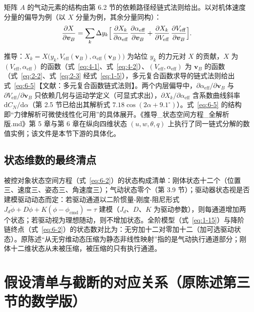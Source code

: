 \documentclass[11pt,a4paper]{ctexart}
\numberwithin{equation}{section}
\begin{document}
矩阵 $A$ 的气动元素的结构由第 6.2 节的依赖路径经链式法则给出。以对机体速度分量的偏导为例（以 $X$ 分量为例，其余分量同构）：
\begin{equation}
  \frac{\partial X}{\partial\bm{v}_B} = \sum_k \Delta y_k \Bigl[\, \frac{\partial X_k}{\partial\alpha_{\text{eff}}}\,\frac{\partial\alpha_{\text{eff}}}{\partial\bm{v}_B}
  + \frac{\partial X_k}{\partial V_{\text{eff}}}\,\frac{\partial V_{\text{eff}}}{\partial\bm{v}_B} \Bigr]. \label{eq:6-5}
\end{equation}

推导：$X_k = X\bigl(y_k, V_{\text{eff}}(\bm{v}_B), \alpha_{\text{eff}}(\bm{v}_B)\bigr)$ 为站位 $y_k$ 的力元对 $X$ 的贡献，$X$ 为 $(V_{\text{eff}}, \alpha_{\text{eff}})$ 的函数（式~\eqref{eq:4-1}、式~\eqref{eq:4-2}）、$(V_{\text{eff}}, \alpha_{\text{eff}})$ 为 $\bm{v}_B$ 的函数（式~\eqref{eq:2-2}、式~\eqref{eq:2-3} 经式~\eqref{eq:1-5}），多元复合函数求导的链式法则给出式~\eqref{eq:6-5}【文献：多元复合函数链式法则】。两个内层偏导中，$\partial\alpha_{\text{eff}}/\partial\bm{v}_B$ 与 $\partial V_{\text{eff}}/\partial\bm{v}_B$ 只依赖几何与运动学定义（可显式求出），$\partial X_k/\partial\alpha_{\text{eff}}$ 含系数曲线斜率 $\mathrm{d}C_N/\mathrm{d}\alpha$（第 2.5 节已给出其解析式 $7.18\cos(2\alpha + 9.1^\circ)$）。式~\eqref{eq:6-5} 的结构即“力律解析可微使线性化可用”的具体展开。《推导\_状态空间方程\_全解析版.md》第 5 章与第 6 章在纵向四维状态 $(u, w, \theta, q)$ 上执行了同一链式分解的数值实例；该文件是本节下游的具体化。

\subsection{状态维数的最终清点}

被控对象状态空间方程（式~\eqref{eq:6-2}）的状态构成清单：刚体状态十二个（位置三、速度三、姿态三、角速度三）；气动状态零个（第 3.9 节）；驱动器状态视是否建模驱动动态而定：若驱动通道以二阶惯量-刚度-阻尼形式 $J_d\ddot{\phi} + D\dot{\phi} + K(\phi - \phi_{\text{cmd}}) = \tau$ 建模（$J_d$、$D$、$K$ 为驱动参数），则每通道增加两个状态；若驱动视为理想随动，则不增加状态。全阶模型（式~\eqref{eq:1-15}）与降阶链终点（式~\eqref{eq:6-2}）的状态数对比为：无穷加十二对零加十二（加可选驱动状态）。原陈述“从无穷维动态压缩为静态非线性映射”指的是气动执行通道部分；刚体十二维状态从未被压缩，被压缩的只有执行通道。

\section{假设清单与截断的对应关系（原陈述第三节的数学版）}\label{sec:assumptions}
\end{document}
